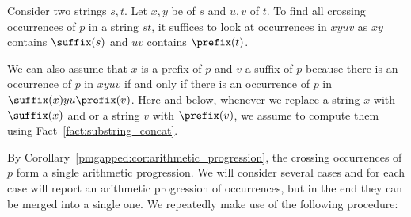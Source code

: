 Consider two strings $s,t$. Let $x, y$ be  of $s$ and $u, v$  of $t$. To find all crossing occurrences of $p$ in a string $st$, it suffices to look at occurrences in $xyuv$ as $xy$ contains $\suffix(s)$ and $uv$ contains $\prefix(t)$.

We can also assume that $x$ is a prefix of $p$ and $v$ a suffix of $p$ because there is an occurrence of $p$ in $xyuv$ if and only if there is an occurrence of $p$ in $\suffix(x) y u\prefix(v)$. Here and below, whenever we replace a string $x$ with $\suffix(x)$ and or a string $v$ with $\prefix(v)$, we assume to compute them using Fact~\ref{fact:substring_concat}. 

By Corollary~\ref{pmgapped:cor:arithmetic_progression}, the crossing occurrences of $p$ form a single arithmetic progression. 
We will consider several cases and for each case will report an arithmetic progression of occurrences, but in the end they can be merged into a single one. We repeatedly make use of the following procedure:

